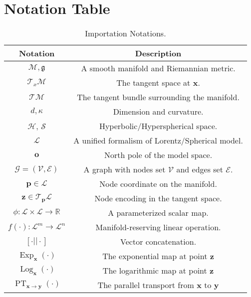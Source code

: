 \section{Notation Table}
\vspace{-0.1in}
\begin{table}[h]
\centering
\caption{Importation Notations.}
\vspace{-0.15in}
\label{table. notation}
\begin{tabular}{c|c}
\hline
\textbf{Notation} & \textbf{Description}   \\
\hline
$\mathcal{M},\mathfrak{g}$        & A smooth manifold and Riemannian metric.        \\
\hline
$\mathcal{T}_x\mathcal{M}$        & The tangent space at $\boldsymbol{x}$.        \\
\hline
$\mathcal{T}\mathcal{M}$         & The tangent bundle surrounding the manifold.        \\
\hline
 $d, \kappa$  &  Dimension and curvature. \\
 \hline
 $\mathcal H$, $\mathcal S$ & Hyperbolic/Hyperspherical space. \\
  \hline
 $\mathcal L$ & A unified formalism of Lorentz/Spherical model.\\
 \hline
 $\boldsymbol{o}$ & North pole of the model space. \\
   \hline
 $\mathcal{G}=(\mathcal{V}, \mathcal{E})$ & A graph with nodes set $\mathcal{V}$ and edges set $\mathcal{E}$.\\
    \hline
 $\boldsymbol{p}\in \mathcal{L}$ & Node coordinate on the manifold.\\
  \hline
   $\boldsymbol{z} \in \mathcal{T}_{\boldsymbol{p}}\mathcal{L}$ & Node encoding in the tangent space.\\
  \hline
 $\phi:\mathcal{L}\times\mathcal{L}\rightarrow \mathbb{R}$ & A parameterized scalar map. \\
 \hline
 $f(\cdot):\mathcal{L}^m \rightarrow \mathcal{L}^n$ & Manifold-reserving linear operation. \\
 \hline
 $[\cdot || \cdot]$ & Vector concatenation. \\
 \hline
 $\operatorname{Exp}_{\boldsymbol{x}}(\cdot)$ & The exponential map at point $\mathbf{z}$ \\
 \hline
 $\operatorname{Log}_{\boldsymbol{x}}(\cdot)$ & The logarithmic map at point $\mathbf{z}$ \\
  \hline
 $\operatorname{PT}_{\boldsymbol x \rightarrow \boldsymbol y}(\cdot)$ & The parallel transport from $\boldsymbol x$ to $\boldsymbol y$\\
 \hline
\end{tabular}
\vspace{-0.1in}
\end{table}

